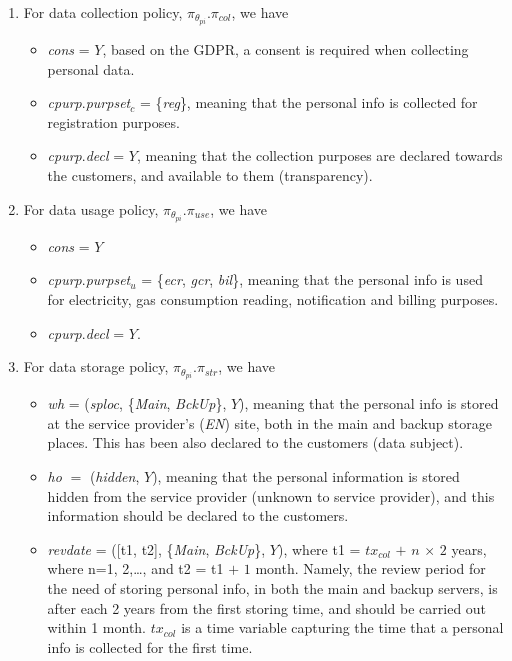 \documentclass[a4paper]{article}
\begin{document}
\begin{enumerate}
\item For data collection policy, $\pi_{\theta_{pi}}$.$\pi_{col}$, we have 
\begin{itemize}
\item \textit{cons} = $Y$, based on the GDPR, a consent is required when collecting personal data.  
\item  \textit{cpurp}.\textit{purpset}$_c$ = \{\textit{reg}\}, meaning that the personal info is collected for registration purposes.  
\item \textit{cpurp}.\textit{decl} = $Y$, meaning that the collection purposes are declared towards the customers, and available to them (transparency).  
\end{itemize}

\item For data usage policy, $\pi_{\theta_{pi}}$.$\pi_{use}$, we have 
\begin{itemize}
\item \textit{cons} = $Y$ 
\item  \textit{cpurp}.\textit{purpset}$_u$ = \{\textit{ecr}, \textit{gcr}, \textit{bil}\}, meaning that the personal info is used for electricity, gas consumption reading, notification and billing purposes. 
\item \textit{cpurp}.\textit{decl} = $Y$.  
\end{itemize}

\item For data storage policy, $\pi_{\theta_{pi}}$.$\pi_{str}$, we have 
\begin{itemize} 
\item \textit{wh} = (\textit{sploc}, \{\textit{Main}, \textit{BckUp}\}, $Y$), meaning that the personal info is stored at the service provider's (\textit{EN}) site, both in the main and backup storage places. This has been also declared to the customers (data subject).     

\item \textit{ho} $=$ (\textit{hidden}, $Y$), meaning that the personal information is stored hidden from the service provider (unknown to service provider), and this information should be declared to the customers. 

\item \textit{revdate} = ([t1, t2], \{\textit{Main}, \textit{BckUp}\}, $Y$), where t1 = $tx_{col}$ $+$ $n$ $\times$ $2$ years, where n={1, 2,\dots,} and t2 = t1 $+$ $1$ month. Namely, the review period for the need of storing personal info, in both the main and backup servers, is  after each 2 years from the first storing time, and should be carried out within 1 month. $tx_{col}$ is a time variable capturing the time that a personal info is collected for the first time.
\end{itemize}   


\end{enumerate}
\end{document}
